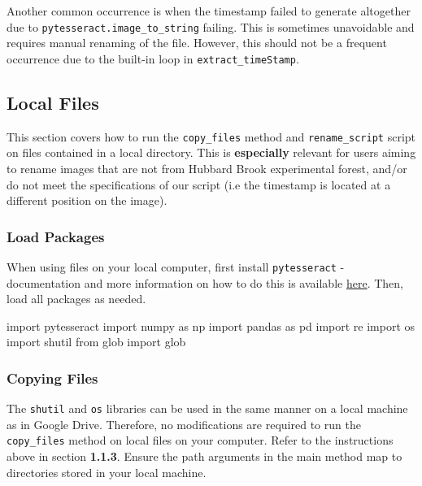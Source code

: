 \documentclass[
]{article}
\newenvironment{Shaded}{\begin{snugshade}}{\end{snugshade}}
\newcommand{\ImportTok}[1]{#1}
\newcommand{\NormalTok}[1]{#1}
\begin{document}
Another common occurrence is when the timestamp failed to generate altogether due
to \texttt{pytesseract.image\_to\_string} failing. This is sometimes unavoidable and requires manual renaming of the file. However, this should not be a frequent occurrence due to the built-in loop in \texttt{extract\_timeStamp}.

\hypertarget{local-files}{%
\subsection{Local Files}\label{local-files}}

This section covers how to run the \texttt{copy\_files} method and \texttt{rename\_script} script
on files contained in a local directory. This is \textbf{especially} relevant for users
aiming to rename images that are not from Hubbard Brook experimental forest, and/or
do not meet the specifications of our script (i.e the timestamp is located at a
different position on the image).

\hypertarget{load-packages-1}{%
\subsubsection{Load Packages}\label{load-packages-1}}

When using files on your local computer, first install \texttt{pytesseract} - documentation
and more information on how to do this is available \href{https://pypi.org/project/pytesseract/}{here}. Then, load all packages as needed.

\begin{Shaded}
\begin{Highlighting}[]
\ImportTok{import}\NormalTok{ pytesseract}
\ImportTok{import}\NormalTok{ numpy }\ImportTok{as}\NormalTok{ np}
\ImportTok{import}\NormalTok{ pandas }\ImportTok{as}\NormalTok{ pd}
\ImportTok{import}\NormalTok{ re}
\ImportTok{import}\NormalTok{ os}
\ImportTok{import}\NormalTok{ shutil}
\ImportTok{from}\NormalTok{ glob }\ImportTok{import}\NormalTok{ glob}
\end{Highlighting}
\end{Shaded}

\hypertarget{copying-files-1}{%
\subsubsection{Copying Files}\label{copying-files-1}}

The \texttt{shutil} and \texttt{os} libraries can be used in the same manner on a local machine
as in Google Drive. Therefore, no modifications are required to run the \texttt{copy\_files} method on local files on your computer. Refer to the instructions above in section \textbf{1.1.3}. Ensure the path arguments in the main method map to directories stored in your local machine.
\end{document}
